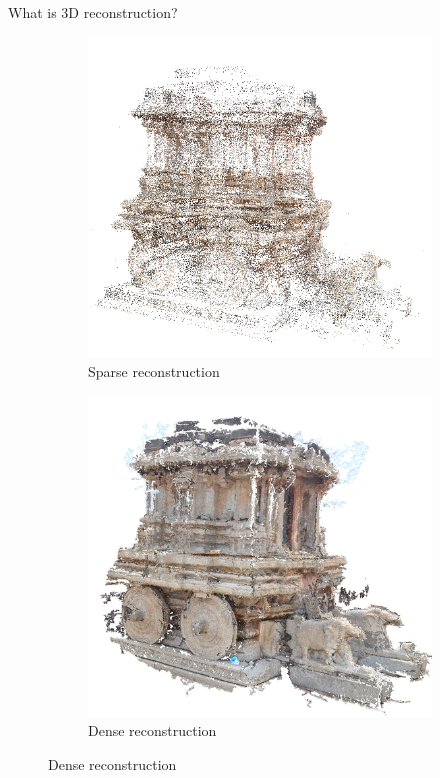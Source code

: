 \documentclass{beamer}
\begin{document}
\begin{frame}{What is 3D reconstruction?}{}
    \begin{figure}[ht!]
      \centering
      \begin{subfigure}{.5\textwidth}
          \centering
          \includegraphics[width=1.0\linewidth]{sparse_chariot.png}
          \caption{Sparse reconstruction}
          \label{fig:sub1}
      \end{subfigure}%
      \begin{subfigure}{.5\textwidth}
          \centering
          \includegraphics[width=1.0\linewidth]{dense_chariot.png}
          \caption{Dense reconstruction}
          \label{fig:sub2}
      \end{subfigure}
      \label{figstart}
    \end{figure}
\end{frame}
\end{document}
